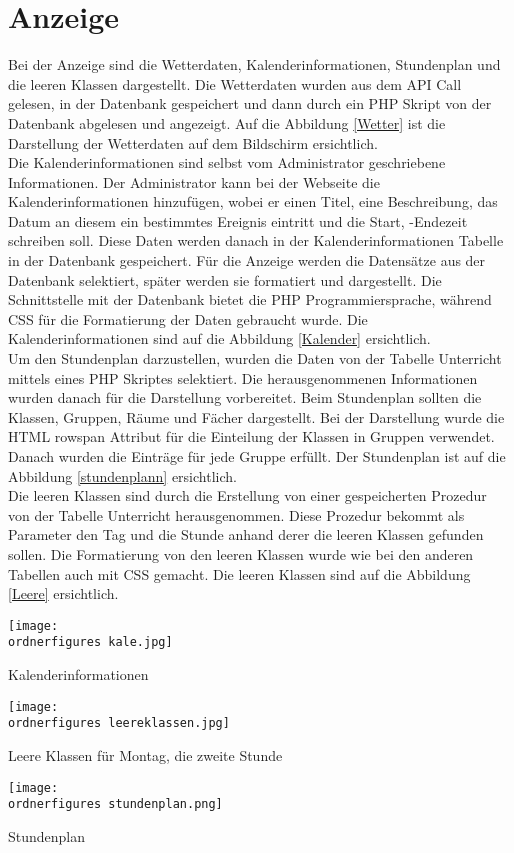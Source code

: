 \section{Anzeige}
Bei der Anzeige sind die Wetterdaten, Kalenderinformationen, Stundenplan und die leeren Klassen dargestellt. Die Wetterdaten wurden aus dem API Call gelesen, in der Datenbank gespeichert und dann durch ein PHP Skript von der Datenbank abgelesen und angezeigt. Auf die Abbildung \ref{Wetter} ist die Darstellung der Wetterdaten auf dem Bildschirm ersichtlich. \\
Die Kalenderinformationen sind selbst vom Administrator geschriebene Informationen. Der Administrator kann bei der Webseite die Kalenderinformationen hinzuf\"ugen, wobei er einen Titel, eine Beschreibung, das Datum an diesem ein bestimmtes Ereignis eintritt und die Start, -Endezeit schreiben soll. Diese Daten werden danach in der Kalenderinformationen Tabelle in der Datenbank gespeichert. F\"ur die Anzeige werden die Datens\"atze aus der Datenbank selektiert, sp\"ater werden sie formatiert und dargestellt. Die Schnittstelle mit der Datenbank bietet die PHP Programmiersprache, w\"ahrend CSS f\"ur die Formatierung der Daten gebraucht wurde. Die Kalenderinformationen sind auf die Abbildung \ref{Kalender} ersichtlich. \\
Um den Stundenplan darzustellen, wurden die Daten von der Tabelle Unterricht mittels eines PHP Skriptes selektiert. Die herausgenommenen Informationen wurden danach f\"ur die Darstellung vorbereitet.  Beim Stundenplan sollten die Klassen, Gruppen, R\"aume und F\"acher dargestellt. Bei der Darstellung wurde die HTML rowspan Attribut f\"ur die Einteilung der Klassen in Gruppen verwendet. Danach wurden die Eintr\"age f\"ur jede Gruppe erf\"ullt. Der Stundenplan ist auf die Abbildung \ref{stundenplann} ersichtlich. \\
Die leeren Klassen sind durch die Erstellung von einer gespeicherten Prozedur von der Tabelle Unterricht herausgenommen. Diese Prozedur bekommt als Parameter den Tag und die Stunde anhand derer die leeren Klassen gefunden sollen. Die Formatierung von den leeren Klassen wurde wie bei den anderen Tabellen auch mit CSS gemacht. Die leeren Klassen sind auf die Abbildung \ref{Leere} ersichtlich. \\
\begin{center}
	\captionsetup{type=figure}
	\texttt{[image: \\ordnerfigures kale.jpg]}
	\caption{Kalenderinformationen}
	\label{Kalender}
\end{center}
\begin{center}
	\captionsetup{type=figure}
	\texttt{[image: \\ordnerfigures leereklassen.jpg]}
	\caption{Leere Klassen f\"ur Montag, die zweite Stunde}
	\label{Leere} 
\end{center}
\begin{center}
	\captionsetup{type=figure}
	\texttt{[image: \\ordnerfigures stundenplan.png]}
	\caption{Stundenplan}
	\label{stundenplann} 
\end{center}
